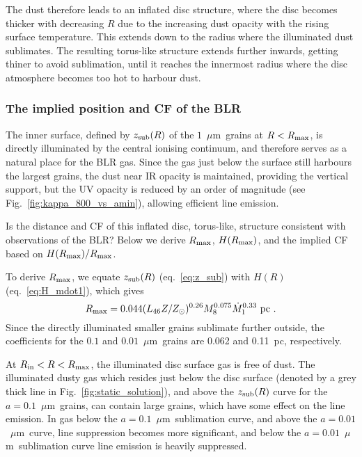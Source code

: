 \documentclass[a4paper,fleqn,usenatbib]{mnras}
\newcommand{\mdot}{\dot{M}}
\newcommand{\mic}{\mbox{$\mu$m}}
\begin{document}
The dust therefore leads to an inflated disc structure, where the disc becomes thicker with decreasing
$R$ due to the increasing dust opacity with the rising surface temperature. This extends down to the radius 
where the illuminated dust sublimates. The resulting torus-like structure extends further inwards, 
getting thiner to avoid sublimation, until it reaches the innermost radius where the disc atmosphere
becomes too hot to harbour dust.



\subsubsection{The implied position and CF of the BLR} \label{sec:sub_static:sub:implied_RandCF}

The inner surface, defined by $z_{\rm sub}(R)$ of the $1$~\mic\ grains at $R<R_{\rm max}$, 
is directly illuminated by the central ionising continuum, and therefore serves
as a natural place for the BLR gas. Since the gas just below the surface still harbours the largest grains,
the dust near IR opacity is maintained, providing the vertical support, but the UV opacity is reduced 
by an order of magnitude (see Fig.~\ref{fig:kappa_800_vs_amin}), allowing efficient line emission.

Is the distance and CF of this inflated disc, torus-like, structure consistent with observations of the BLR?
Below we derive $R_{\rm max}$, $H(R_{\rm max})$, and the implied CF 
based on $H(R_{\rm max})/R_{\rm max}$.

To derive $R_{\rm max}$, we equate $z_{\rm sub}(R)$ (eq.~\ref{eq:z_sub}) with $H(R)$ (eq.~\ref{eq:H_mdot1}), 
which gives
\begin{equation}
  R_{\rm max}=0.044(L_{46}Z/Z_{\odot})^{0.26}M_8^{0.075}\mdot_1^{0.33}~{\rm  pc}\ . \label{eq:R_max}
\end{equation}
Since the directly illuminated smaller grains sublimate further outside, 
the coefficients for the $0.1$ and $0.01$~\mic\ grains are 0.062 and 0.11~pc, respectively. 

At $R_{\rm in}<R<R_{\rm max}$, the illuminated disc surface gas is free of dust.
The illuminated dusty gas which resides just below the disc surface (denoted by a grey thick line in Fig.~\ref{fig:static_solution}), and above the $z_{\rm sub}(R)$ curve for the $a=0.1$~\mic\ grains, 
can contain large grains, which have some effect on the line emission. In gas 
below the $a=0.1$~\mic\ sublimation curve, and above the $a=0.01$~\mic\ curve, line 
suppression becomes more significant, and below the $a=0.01$~\mic\ sublimation curve
line emission is heavily suppressed. 
\end{document}
